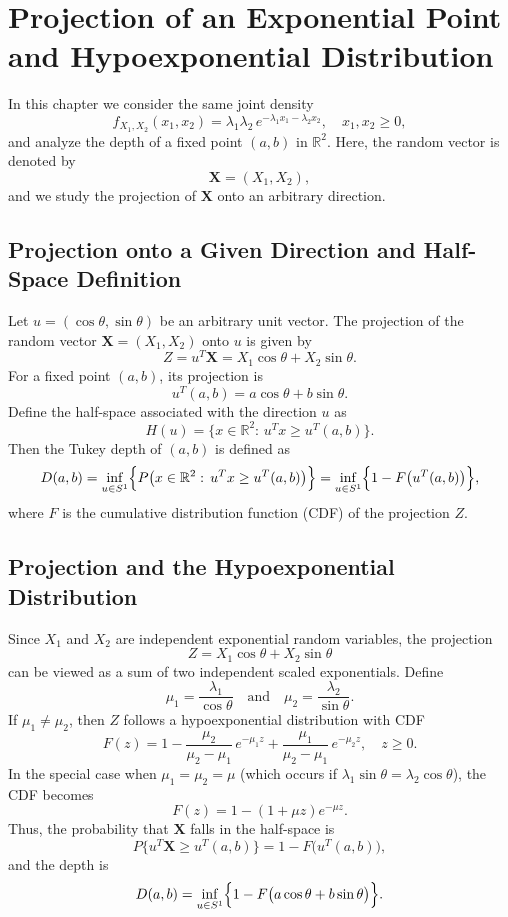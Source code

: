 \chapter{Projection of an Exponential Point and Hypoexponential Distribution}

In this chapter we consider the same joint density 
\[
f_{X_1,X_2}(x_1,x_2)=\lambda_1\lambda_2\, e^{-\lambda_1 x_1-\lambda_2 x_2},\quad x_1,x_2\ge0,
\]
and analyze the depth of a fixed point \((a,b)\) in \(\mathbb{R}^2\). Here, the random vector is denoted by 
\[
\mathbf{X}=(X_1,X_2),
\]
and we study the projection of \(\mathbf{X}\) onto an arbitrary direction.

\section{Projection onto a Given Direction and Half-Space Definition}

Let \(u=(\cos\theta,\sin\theta)\) be an arbitrary unit vector. The projection of the random vector \(\mathbf{X}=(X_1,X_2)\) onto \(u\) is given by
\[
Z = u^T \mathbf{X} = X_1\cos\theta + X_2\sin\theta.
\]
For a fixed point \((a,b)\), its projection is
\[
u^T(a,b)=a\cos\theta+b\sin\theta.
\]
Define the half-space associated with the direction \(u\) as
\[
H(u)=\{x\in\mathbb{R}^2 : \, u^T x \ge u^T(a,b)\}.
\]
Then the Tukey depth of \((a,b)\) is defined as
\[
D(a,b)=\inf_{u\in S^1}\Bigl\{P\bigl(x\in\mathbb{R}^2: \, u^T x \ge u^T(a,b)\bigr)\Bigr\} 
= \inf_{u\in S^1}\Bigl\{1-F\bigl(u^T(a,b)\bigr)\Bigr\},
\]
where \(F\) is the cumulative distribution function (CDF) of the projection \(Z\).

\section{Projection and the Hypoexponential Distribution}

Since \(X_1\) and \(X_2\) are independent exponential random variables, the projection
\[
Z = X_1\cos\theta + X_2\sin\theta
\]
can be viewed as a sum of two independent scaled exponentials. Define
\[
\mu_1 = \frac{\lambda_1}{\cos\theta} \quad \text{and} \quad \mu_2 = \frac{\lambda_2}{\sin\theta}.
\]
If \(\mu_1\neq \mu_2\), then \(Z\) follows a hypoexponential distribution with CDF
\[
F(z)= 1 - \frac{\mu_2}{\mu_2-\mu_1}\,e^{-\mu_1z} + \frac{\mu_1}{\mu_2-\mu_1}\,e^{-\mu_2z}, \quad z\ge0.
\]
In the special case when \(\mu_1=\mu_2=\mu\) (which occurs if \(\lambda_1\sin\theta=\lambda_2\cos\theta\)), the CDF becomes
\[
F(z)= 1 - (1+\mu z)e^{-\mu z}.
\]
Thus, the probability that \(\mathbf{X}\) falls in the half-space is
\[
P\{u^T \mathbf{X}\ge u^T(a,b)\} = 1 - F\bigl(u^T(a,b)\bigr),
\]
and the depth is
\[
D(a,b)= \inf_{u\in S^1}\Bigl\{ 1-F\bigl(a\cos\theta+b\sin\theta\bigr)\Bigr\}.
\]

